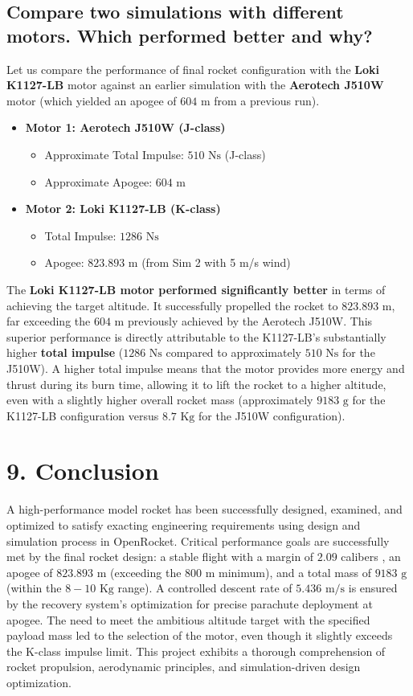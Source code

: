 \documentclass[12pt, a4paper]{article}
\begin{document}
\subsection{Compare two simulations with different motors. Which performed better and why?}
Let us compare the performance of final rocket configuration with the \textbf{Loki K1127-LB} motor against an earlier simulation with the \textbf{Aerotech J510W} motor (which yielded an apogee of $604 \text{ m}$ from a previous run).
\begin{itemize}
    \item \textbf{Motor 1: Aerotech J510W (J-class)}
    \begin{itemize}
        \item Approximate Total Impulse: $510 \text{ Ns}$ (J-class)
        \item Approximate Apogee: $604 \text{ m}$
    \end{itemize}
    \item \textbf{Motor 2: Loki K1127-LB (K-class)}
    \begin{itemize}
        \item Total Impulse: $1286 \text{ Ns}$
        \item Apogee: $823.893 \text{ m}$ (from Sim 2 with 5 m/s wind)
    \end{itemize}
\end{itemize}
The \textbf{Loki K1127-LB motor performed significantly better} in terms of achieving the target altitude. It successfully propelled the rocket to $823.893 \text{ m}$, far exceeding the $604 \text{ m}$ previously achieved by the Aerotech J510W. This superior performance is directly attributable to the K1127-LB's substantially higher \textbf{total impulse} ($1286 \text{ Ns}$ compared to approximately $510 \text{ Ns}$ for the J510W). A higher total impulse means that the motor provides more energy and thrust during its burn time, allowing it to lift the rocket to a higher altitude, even with a slightly higher overall rocket mass (approximately $9183 \text{ g}$ for the K1127-LB configuration versus $8.7 \text{ Kg}$ for the J510W configuration).

\section*{9. Conclusion}

A high-performance model rocket has been successfully designed, examined, and optimized to satisfy exacting engineering requirements using design and simulation process in OpenRocket. Critical performance goals are successfully met by the final rocket design: a stable flight with a margin of $2.09$ calibers , an apogee of $823.893 \text{ m}$ (exceeding the $800 \text{ m}$ minimum), and a total mass of $9183 \text{ g}$ (within the $8-10 \text{ Kg}$ range). A controlled descent rate of $5.436 \text{ m/s}$ is ensured by the recovery system's optimization for precise parachute deployment at apogee. The need to meet the ambitious altitude target with the specified payload mass led to the selection of the motor, even though it slightly exceeds the K-class impulse limit. This project exhibits a thorough comprehension of rocket propulsion, aerodynamic principles, and simulation-driven design optimization.
\end{document}
